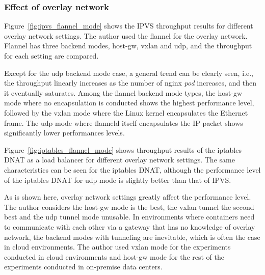 \FloatBarrier

\subsubsection{Effect of overlay network}

Figure~\ref{fig:ipvs_flannel_mode} shows the IPVS throughput results for different overlay network settings.
The author used the flannel for the overlay network.
Flannel has three backend modes, host-gw, vxlan and udp, and the throughput for each setting are compared.

Except for the udp backend mode case, a general trend can be clearly seen, i.e., the throughput linearly increases as the number of nginx {\em pod} increases, and then it eventually saturates.
Among the flannel backend mode types, the host-gw mode where no encapsulation is conducted shows the highest performance level,
followed by the vxlan mode where the Linux kernel encapsulates the Ethernet frame.
The udp mode where flanneld itself encapsulates the IP packet shows significantly lower performances levels.

Figure~\ref{fig:iptables_flannel_mode} shows throughput results of the iptables DNAT as a load balancer for different overlay network settings.
The same characteristics can be seen for the iptables DNAT, although the performance level of the iptables DNAT for udp mode is slightly better than that of IPVS.

As is shown here, overlay network settings greatly affect the performance level.
The author considers the host-gw mode is the best, the vxlan tunnel the second best and the udp tunnel mode unusable.
In environments where containers need to communicate with each other via a gateway that has no knowledge of overlay network, the backend modes with tunneling are inevitable, which is often the case in cloud environments. 
The author used vxlan mode for the experiments conducted in cloud environments and host-gw mode for the rest of the experiments conducted in on-premise data centers.


